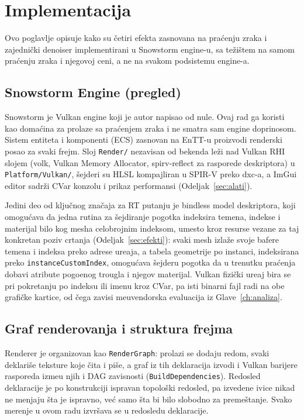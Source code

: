 \chapter{Implementacija}
\label{ch:implementacija}


Ovo poglavlje opisuje kako su \v{c}etiri efekta zasnovana na pra\'cenju zraka i zajedni\v{c}ki denoiser implementirani u Snowstorm engine-u, sa te\v{z}i\v{s}tem na samom pra\'cenju zraka i njegovoj ceni, a ne na svakom podsistemu engine-a.

\section{Snowstorm Engine (pregled)}
\label{sec:engine}

Snowstorm je Vulkan engine koji je autor napisao od nule. Ovaj rad ga koristi kao doma\'cina za prolaze sa pra\'cenjem zraka i ne smatra sam engine doprinosom. Sistem entiteta i komponenti (ECS) zasnovan na EnTT-u proizvodi renderski posao za svaki frejm. Sloj \texttt{Render/} nezavisan od bekenda le\v{z}i nad Vulkan RHI slojem (volk, Vulkan Memory Allocator, spirv-reflect za rasporede deskriptora) u \texttt{Platform/Vulkan/}, \v{s}ejderi su HLSL kompajliran u SPIR-V preko dxc-a, a ImGui editor sadr\v{z}i CVar konzolu i prikaz performansi (Odeljak~\ref{sec:alati}).

Jedini deo od klju\v{c}nog zna\v{c}aja za RT putanju je bindless model deskriptora, koji omogu\'cava da jedna rutina za \v{s}ejdiranje pogotka indeksira temena, indekse i materijal bilo kog mesha celobrojnim indeksom, umesto kroz resurse vezane za taj konkretan poziv crtanja (Odeljak~\ref{sec:efekti}): svaki mesh izla\v{z}e svoje bafere temena i indeksa preko adrese ure\dj{}aja, a tabela geometrije po instanci, indeksirana preko \texttt{instanceCustomIndex}, omogu\'cava \v{s}ejderu pogotka da u trenutku pra\'cenja dobavi atribute pogo\dj{}enog trougla i njegov materijal. Vulkan fizi\v{c}ki ure\dj{}aj bira se pri pokretanju po indeksu ili imenu kroz CVar, pa isti binarni fajl radi na obe grafi\v{c}ke kartice, od \v{c}ega zavisi me\dj{}uvendorska evaluacija iz Glave~\ref{ch:analiza}.

\section{Graf renderovanja i struktura frejma}
\label{sec:rendergraph}

Renderer je organizovan kao \texttt{RenderGraph}: prolazi se dodaju redom, svaki deklari\v{s}e teksture koje \v{c}ita i pi\v{s}e, a graf iz tih deklaracija izvodi i Vulkan barijere rasporeda izme\dj{}u njih i DAG zavisnosti (\texttt{BuildDependencies}). Redosled deklaracije je po konstrukciji ispravan topolo\v{s}ki redosled, pa izvedene ivice nikad ne menjaju \v{s}ta je ispravno, ve\'c samo \v{s}ta bi bilo slobodno za preme\v{s}tanje. Svako merenje u ovom radu izvr\v{s}ava se u redosledu deklaracije.

